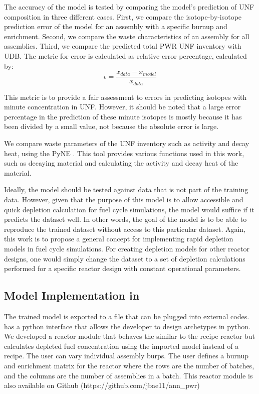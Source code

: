 The accuracy of the model is tested by comparing
the model's prediction of \gls{UNF} composition
in three different cases. First, we compare the
isotope-by-isotope prediction error of the model for an
assembly with a specific burnup and enrichment.
Second, we compare the waste characteristics of
an assembly for all assemblies. Third, we compare
the predicted total \gls{PWR} \gls{UNF} inventory with
\gls{UDB}. The metric for error is calculated as
relative error percentage, calculated by:
\begin{equation}
\epsilon = \frac{x_{data} - x_{model}}{x_{data}}
\end{equation}

This metric is to provide a fair assessment to errors
in predicting isotopes with minute concentration in \gls{UNF}.
However, it should be noted that a large error percentage in the
prediction of these minute isotopes is mostly because it has been
divided by a small value, not because the absolute error is large.

We compare waste parameters of the \gls{UNF} inventory
such as activity and decay heat, using the
\gls{PyNE} \cite{scopatz_pyne:_2012}. This tool provides
various functions used
in this work, such as decaying material and calculating
the activity and decay heat of the material.

Ideally, the model should be tested against data
that is not part of the training data. However, given
that the purpose of this model is to allow accessible and
quick depletion calculation for
fuel cycle simulations, the model would suffice if
it predicts the dataset well. In other words, the
goal of the model is to be able to reproduce the
trained dataset without access to this particular dataset.
Again, this work
is to propose a general concept for implementing
rapid depletion models in fuel cycle simulations.
For creating depletion models for other reactor designs,
one would simply change the dataset to a set of depletion
calculations performed for a specific reactor design with
constant operational parameters.


\subsection{Model Implementation in \Cyclus}

The trained model is exported to a file
that can be plugged into external codes. \Cyclus
has a python interface that allows the developer
to design archetypes in python. We developed a reactor
module that behaves the similar to the recipe reactor
but calculates depleted fuel concentration using the
imported model instead of a recipe. The user can vary
individual assembly burps. The user defines a burnup
and enrichment
matrix for the reactor where the rows are the number
of batches, and the columns are the number of
assemblies in a batch. This reactor module is also
available on Github 
(https://github.com/jbae11/ann\_pwr)

